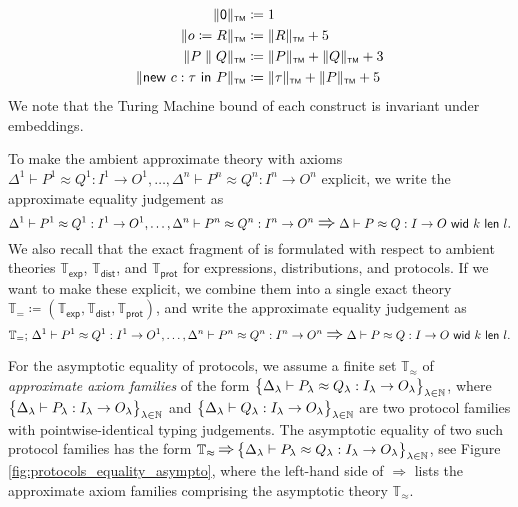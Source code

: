 \begin{align*}
\Vert \mathsf{0} \Vert_{\scriptscriptstyle \mathsf{TM}} & \coloneqq 1 \\
\Vert o \coloneqq R \Vert_{\scriptscriptstyle \mathsf{TM}} & \coloneqq \Vert R \Vert_{\scriptscriptstyle \mathsf{TM}} + 5 \\
\Vert P \; \| \; Q \Vert_{\scriptscriptstyle \mathsf{TM}} & \coloneqq \Vert P \Vert_{\scriptscriptstyle \mathsf{TM}} + \Vert Q \Vert_{\scriptscriptstyle \mathsf{TM}} + 3 \\
\Vert \mathsf{new} \ c : \tau \ \mathsf{in} \ P \Vert_{\scriptscriptstyle \mathsf{TM}} & \coloneqq \Vert \tau \Vert_{\scriptscriptstyle \mathsf{TM}} + \Vert P \Vert_{\scriptscriptstyle \mathsf{TM}} + 5
\end{align*}
We note that the Turing Machine bound of each construct is invariant under embeddings. \medskip

\noindent To make the ambient approximate theory with axioms $\Delta^1 \vdash P^1 \approx Q^1 : I^1 \to O^1, \ldots, \Delta^n \vdash P^n \approx Q^n : I^n \to O^n$ explicit, we write the approximate equality judgement as
\[\Delta^1 \vdash P^1 \approx Q^1 : I^1 \to O^1, \ldots, \Delta^n \vdash P^n \approx Q^n : I^n \to O^n \; \mathlarger{\mathlarger{\Rightarrow}} \; \Delta \vdash \approxeq{P}{Q}{I}{O}{k}{l}.\]
We also recall that the exact fragment of \ipdl is formulated with respect to ambient theories $\mathbb{T}_\mathsf{exp}$, $\mathbb{T}_\mathsf{dist}$, and $\mathbb{T}_\mathsf{prot}$ for expressions, distributions, and protocols. If we want to make these explicit, we combine them into a single exact \ipdl theory $\mathbb{T}_= \coloneqq (\mathbb{T}_\mathsf{exp}, \mathbb{T}_\mathsf{dist}, \mathbb{T}_\mathsf{prot})$, and write the approximate equality judgement as
\[\mathbb{T}_=; \, \Delta^1 \vdash P^1 \approx Q^1 : I^1 \to O^1, \ldots, \Delta^n \vdash P^n \approx Q^n : I^n \to O^n \; \mathlarger{\mathlarger{\Rightarrow}} \; \Delta \vdash \approxeq{P}{Q}{I}{O}{k}{l}.\]

\noindent For the asymptotic equality of \ipdl protocols, we assume a finite set $\mathbb{T}_\approx$ of \emph{approximate axiom families} of the form $\big\{\Delta_\lambda \vdash P_\lambda \approx Q_\lambda : I_\lambda \to O_\lambda\big\}_{\lambda \in \mathbb{N}}$, where $\big\{\Delta_\lambda \vdash P_\lambda : I_\lambda \to O_\lambda\big\}_{\lambda \in \mathbb{N}}$ and $\big\{\Delta_\lambda \vdash Q_\lambda : I_\lambda \to O_\lambda\big\}_{\lambda \in \mathbb{N}}$ are two protocol families with pointwise-identical typing judgements. The asymptotic equality of two such protocol families has the form $\mathbb{T}_\approx \, \mathlarger{\mathlarger{\Rightarrow}} \, \big\{\Delta_\lambda \vdash P_\lambda \approx Q_\lambda : I_\lambda \to O_\lambda\big\}_{\lambda \in \nat}$, see Figure \ref{fig:protocols_equality_asympto}, where the left-hand side of $\Rightarrow$ lists the approximate axiom families comprising the asymptotic \ipdl theory $\mathbb{T}_\approx$.

